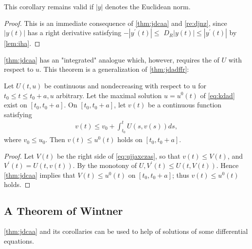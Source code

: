 \documentclass{article}
\begin{document}
\begin{rema}
This corollary remains valid if $|y|$ denotes the Euclidean norm.
\end{rema}
\begin{proof}
This is an immediate consequence of \cref{thm:jdcaa} and \cref{re:djnz}, since $|y(t)|$ has a right derivative satisfying $-\left|y^{\prime}(t)\right| \le$ $D_{R}|y(t)| \le\left|y^{\prime}(t)\right|$ by \cref{lem:iha}.
\end{proof}

\cref{thm:jdcaa} has an "integrated" analogue which, however, requires the  of $U$ with respect to $u$. This theorem is a generalization of \cref{thm:jdadffr}:

\begin{thma}
Let $U(t, u)$ be continuous and nondecreasing with respect to u for $t_{0} \le t \le t_{0}+a, u$ arbitrary. Let the maximal solution $u=u^{0}(t)$ of \cref{eq:kdad} exist on $\left[t_{0}, t_{0}+a\right]$. On $\left[t_{0}, t_{0}+a\right]$, let $v(t)$ be a continuous function satisfying
\begin{align}
v(t) \le v_{0}+\int_{t_{0}}^{t} U(s, v(s)) d s,\label{eq:ujjaxczas}
\end{align}
where $v_{0} \le u_{0}$. Then $v(t) \le u^{0}(t)$ holds on $\left[t_{0}, t_{0}+a\right]$.
\end{thma} 
\begin{proof}
Let $V(t)$ be the right side of \cref{eq:ujjaxczas}, so that $v(t) \le V(t)$, and $V^{\prime}(t)=U(t, v(t))$. By the monotony of $U, V^{\prime}(t) \le U(t, V(t))$. Hence \cref{thm:jdcaa} implies that $V(t) \le u^{0}(t)$ on $\left[t_{0}, t_{0}+a\right]$; thus $v(t) \le u^{0}(t)$ holds.
\end{proof}

\subsection{A Theorem of Wintner}
\cref{thm:jdcaa} and its corollaries can be used to help  of solutions of some differential equations.
\end{document}
